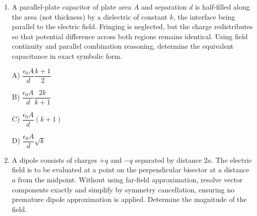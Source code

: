 \documentclass[12pt]{article}
\begin{document}
\begin{enumerate}[leftmargin=*]
\begin{center}
\end{center}

A) $1-2^{-(\gamma-1)/\gamma}$

B) $1-\dfrac{1}{2}$

C) $1-2^{-(\gamma-1)}$

D) $1-\dfrac{1}{2^{1/\gamma}}$

\item A parallel-plate capacitor of plate area $A$ and separation $d$ is half-filled along the area (not thickness) by a dielectric of constant $k$, the interface being parallel to the electric field. Fringing is neglected, but the charge redistributes so that potential difference across both regions remains identical. Using field continuity and parallel combination reasoning, determine the equivalent capacitance in exact symbolic form.


\begin{center}
\end{center}

A) $\dfrac{\epsilon_0A}{d}\dfrac{k+1}{2}$

B) $\dfrac{\epsilon_0A}{d}\dfrac{2k}{k+1}$

C) $\dfrac{\epsilon_0A}{d}(k+1)$

D) $\dfrac{\epsilon_0A}{d}\sqrt{k}$

\item A dipole consists of charges $+q$ and $-q$ separated by distance $2a$. The electric field is to be evaluated at a point on the perpendicular bisector at a distance $a$ from the midpoint. Without using far-field approximation, resolve vector components exactly and simplify by symmetry cancellation, ensuring no premature dipole approximation is applied. Determine the magnitude of the field.


\end{enumerate}
\end{document}
